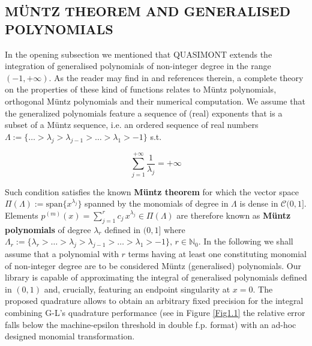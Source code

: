 \documentclass[a4paper, twosided]{book}
\begin{document}
\subsection[Müntz theorem and generalised polynomials]{\changefont MÜNTZ THEOREM AND GENERALISED POLYNOMIALS }\label{SubSec1.2.4}

In the opening subsection we mentioned that QUASIMONT extends the integration of generalised polynomials of non-integer degree in the range $(-1,+\infty)$. As the reader may find in \cite{Lombardi09} and references therein, a complete theory on the properties of these kind of functions relates to Müntz polynomials, orthogonal Müntz polynomials and their numerical computation. We assume that the generalized polynomials feature a sequence of (real) exponents that is a subset of a Müntz sequence, i.e. an ordered sequence of real numbers $\Lambda:=\{\dots>\lambda_j>\lambda_{j-1}>\dots>\lambda_1>-1\}$ s.t.

\begin{equation}\label{eq1.10}
    \sum_{j=1}^{+\infty}\frac{1}{\lambda_j}=+\infty
\end{equation}

\noindent
Such condition satisfies the known \color{poliDarkBlue} \textbf{Müntz theorem} \color{black} for which the vector space $\Pi(\Lambda):=\text{span}\{x^{\lambda_j}\}$ spanned by the monomials of degree in $\Lambda$ is dense in $\mathcal{C}(0,1]$. Elements $p^{(m)}(x) = \sum_{j=1}^{r} c_j\,x^{\lambda_j}\in\Pi(\Lambda)$ are therefore known as \color{poliDarkBlue} \textbf{Müntz polynomials} \color{black} of degree $\lambda_r$ defined in $(0,1]$ where  $\Lambda_r:=\{\lambda_r>\dots>\lambda_j>\lambda_{j-1}>\dots>\lambda_1>-1\},\, r\in\mathbb{N}_0$. In the following we shall assume that a polynomial with $r$ terms having at least one constituting monomial of non-integer degree are to be considered Müntz (generalised) polynomials. Our library is capable of approximating the integral of generalised polynomials defined in $(0,1)$ and, crucially, featuring an endpoint singularity at $x=0$. The proposed quadrature allows to obtain an arbitrary fixed precision for the integral combining G-L's quadrature performance (see in Figure \ref{Fig1.1} the relative error falls below the machine-epsilon threshold in double f.p. format) with an ad-hoc designed monomial transformation.
\end{document}
